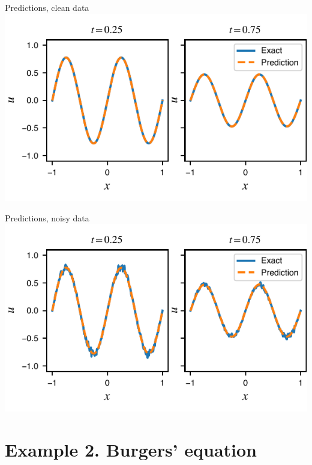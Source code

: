 \documentclass{beamer}
\begin{document}
\begin{frame}{Predictions, clean data}
\centering
\includegraphics{images/heateq-predictions-clean}
\end{frame}

\begin{frame}{Predictions, noisy data}
\centering
\includegraphics{images/heateq-predictions-noise}
\end{frame}




\section{Example 2. Burgers' equation}
\end{document}
